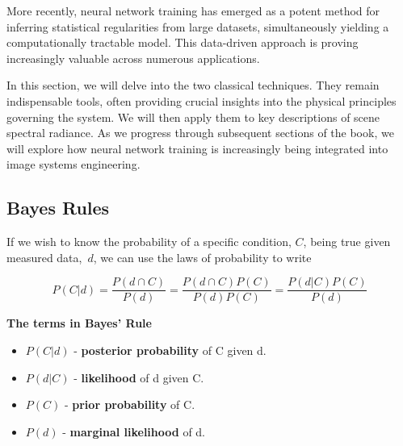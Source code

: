 \documentclass[
  letterpaper,
]{book}
\providecommand{\tightlist}{%
  \setlength{\itemsep}{0pt}\setlength{\parskip}{0pt}}\usepackage{longtable,booktabs,array}
\begin{document}
More recently, neural network training has emerged as a potent method
for inferring statistical regularities from large datasets,
simultaneously yielding a computationally tractable model. This
data-driven approach is proving increasingly valuable across numerous
applications.

In this section, we will delve into the two classical techniques. They
remain indispensable tools, often providing crucial insights into the
physical principles governing the system. We will then apply them to key
descriptions of scene spectral radiance. As we progress through
subsequent sections of the book, we will explore how neural network
training is increasingly being integrated into image systems
engineering.

\subsection{Bayes Rules}\label{bayes-rules}

If we wish to know the probability of a specific condition, \(C\), being
true given measured data,~\(d\), we can use the laws of probability to
write

\[
P(C | d) = \frac{P(d \cap C)}{P(d)} = \frac{P(d \cap C) P(C)}{P(d) P(C)}= \frac{P(d | C) P(C)}{P(d)}
\]

\begin{tcolorbox}[enhanced jigsaw, colframe=quarto-callout-note-color-frame, rightrule=.15mm, breakable, left=2mm, colback=white, leftrule=.75mm, arc=.35mm, opacityback=0, toprule=.15mm, bottomrule=.15mm]
\begin{minipage}[t]{5.5mm}
\textcolor{quarto-callout-note-color}{\faInfo}
\end{minipage}%
\begin{minipage}[t]{\textwidth - 5.5mm}

\vspace{-3mm}\textbf{The terms in Bayes' Rule}\vspace{3mm}

\begin{itemize}
\tightlist
\item
  \(P(C | d)\) - \textbf{posterior probability} of C given d.
\item
  \(P(d|C)\) - \textbf{likelihood} of d given C.
\item
  \(P(C)\) - \textbf{prior probability} of C.
\item
  \(P(d)\) - \textbf{marginal likelihood} of d.
\end{itemize}

\end{minipage}%
\end{tcolorbox}
\end{document}

